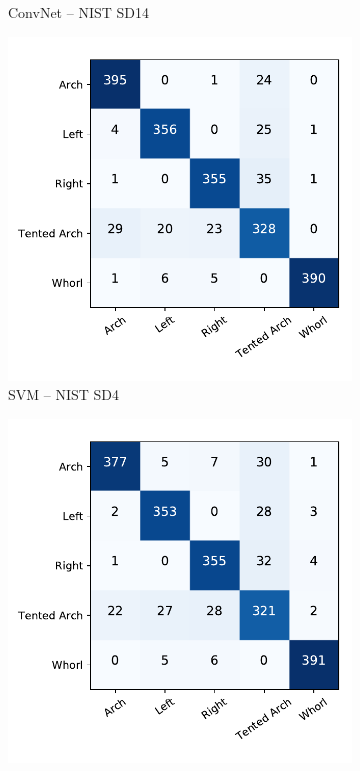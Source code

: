 \begin{figure}[!ht]
\begin{subfigure}[b]{0.25\textwidth}
		\caption{ConvNet -- NIST SD14 }
		\label{fig.cnf_matrix_5class.net_sd14}
	\end{subfigure}%
	\begin{subfigure}[b]{0.25\textwidth}
		\centering
		\includegraphics[width=\linewidth]{fig/figs/confusion_matrix_svm_sd4_cross_subject.pdf}
		\caption{SVM -- NIST SD4 }
		\label{fig.cnf_matrix_5class.svm_sd4}
	\end{subfigure}%
	\begin{subfigure}[b]{0.25\textwidth}
		\centering
		\includegraphics[width=\linewidth]{fig/figs/confusion_matrix_net_sd4_cross_subject.pdf}

\end{subfigure}
\end{figure}
